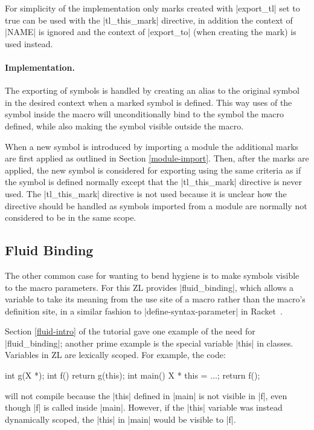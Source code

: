 For simplicity of the implementation only marks created with
|export_tl| set to true can be used with the |tl_this_mark| directive,
in addition the context of |NAME| is ignored and the context of
|export_to| (when creating the mark) is used instead.

\paragraph{Implementation.}

The exporting of symbols is handled by creating an alias to the
original symbol in the desired context when a marked symbol is
defined.  This way uses of the symbol inside the macro will
unconditionally bind to the symbol the macro defined, while also making the
symbol visible outside the macro.  

When a new symbol is introduced by importing a module the additional
marks are first applied as outlined in Section \ref{module-import}.
Then, after the marks are applied, the new symbol is considered for
exporting using the same criteria as if the symbol is defined normally
except that the |tl_this_mark| directive is never used.  The
|tl_this_mark| directive is not used because it is unclear how the
directive should be handled as symbols imported from a module are
normally not considered to be in the same scope.

\subsection{Fluid Binding}
\label{fluid}

The other common case for wanting to bend hygiene is to make symbols
visible to the macro parameters.  For this ZL provides
|fluid_binding|, which allows a variable to take its meaning from the
use site of a macro rather than the macro's definition site, in a
similar fashion to |define-syntax-parameter| in Racket~\cite{plt-tr1,
  syn-parm}.

Section \ref{fluid-intro} of the tutorial gave one example of the need
for |fluid_binding|; another prime example is the special variable
|this| in classes.  Variables in ZL are lexically scoped. For example,
the code:
\begin{code}
int g(X *);
int f() {return g(this);}
int main() {X * this = ...; return f();}
\end{code}
will not compile because the |this| defined in |main| is not visible
in |f|, even though |f| is called inside |main|. However, if the
|this| variable was instead dynamically scoped, the |this| in |main|
would be visible to |f|.
 
